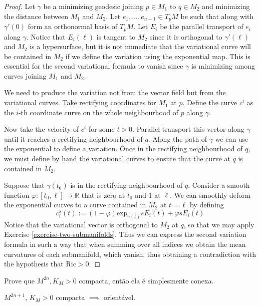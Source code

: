 \begin{proof}

Let $\gamma$ be a minimizing geodesic joining $p \in M_1$ to $q\in M_2$ and
minimizing the distance between $M_1$ and $M_2$. Let $e_1,\ldots,e_{n-1}\in
T_pM$ be such that along with $\gamma'(0)$ form an orthonormal basis of $T_pM$.
Let $E_i$ be the parallel transport of $e_i$ along $\gamma$. Notice that
$E_i(\ell)$ is tangent to $M_2$ since it is orthogonal to $\gamma'(\ell)$ and
$M_2$ is a hypersurface, but it is not immediate that the variational curve will
be contained in $M_2$ if we define the variation using the exponential map. This
is essential for the second variational formula to vanish since $\gamma$ is
minimizing among curves joining $M_1$ and $M_2$.

We need to produce the variation not from the vector field but from the
variational curves. Take rectifying coordinates for $M_1$ at $p$. Define the
curve $c^i$ as the $i$-th coordinate curve on the whole neighbourhood of $p$
along $\gamma$.

Now take the velocity of $c^i$ for some $t>0$. Parallel transport this vector
along $\gamma$ until it reaches a rectifying neighbourhood of $q$. Along the
path of $\gamma$ we can use the exponential to define a variation. Once in the
rectifying neighbourhood of $q$, we must define by hand the variational curves
to ensure that the curve at $q$ is contained in $M_2$.

Suppose that $\gamma(t_0)$ is in the rectifying neighbourhood of $q$. Consider a
smooth function $\varphi:[t_0,\ell]\to \mathbb{R}$ that is zero at $t_0$ and $1$
at $\ell$. We can smoothly deform the exponential curves to a curve contained in
$M_2$ at $t=\ell$ by defining 
$$
c^s_i(t):=(1-\varphi)\text{exp}_{\gamma(t)}sE_i(t)+\varphi sE_i(t)
$$ 
Notice that the variational vector is orthogonal to $M_2$ at $q$, so that we may
apply Exercise \ref{exercise-two-submanifolds}. Thus we can express the second
variation formula in such a way that when summing over all indices we obtain the
mean curvatures of each submanifold, which vanish, thus obtaining a
contradiction with the hypothesis that $\text{Ric}>0$.
\end{proof}

\begin{exercise}
\label{exercise-even-dimension-positive-K-compact-is-simply-connected}
Prove que $M^{2n},K_M>0$ compacta, então ela é simplesmente conexa.
\end{exercise}

\begin{exercise}
\label{exercise-odd-dimension-positive-K-is-orientable}
$M^{2n+1}$, $K_M>0$ compacta $\implies$ orientável.
\end{exercise}

